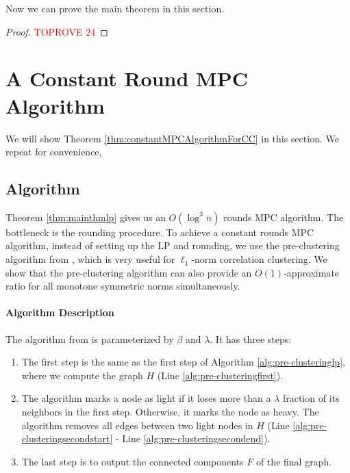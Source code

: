 \documentclass[11pt]{article}
\begin{document}
\begin{CJK*}{UTF8}{gbsn}
Now we can prove the main theorem in this section.

\begin{proof}\textcolor{red}{TOPROVE 24}\end{proof}






%
 
\section{A Constant Round MPC Algorithm}
\label{sec:MPC-solve-LP}
We will show Theorem \ref{thm:constantMPCAlgorithmForCC} in this section. We repeat for convenience, 
\thmconstantMPCAlgorithmForCC*



\subsection{Algorithm}
Theorem \ref{thm:mainthmlp} gives us an $O(\log^3 n)$ rounds MPC algorithm. The bottleneck is the rounding procedure. To achieve a constant rounds MPC algorithm, instead of setting up the LP and rounding, we use the pre-clustering algorithm from \cite{cohen2021correlation}, which is very useful for $\ell_1$-norm correlation clustering. We show that the pre-clustering algorithm can also provide an $O(1)$-approximate ratio for all monotone symmetric
norms simultaneously.

\paragraph{Algorithm Description} The algorithm from \cite{cohen2021correlation} is parameterized by $\beta$ and $\lambda$. It has three steps: 
\begin{enumerate}
    \item The first step is the same as the first step of Algorithm \ref{alg:pre-clusteringlp}, where we compute the graph $H$ (Line \ref{alg:pre-clusteringfirst}).
    \item The algorithm marks a node as light if it loses more than a $\lambda$ fraction of its neighbors in the first step. Otherwise, it marks the node as heavy. The algorithm removes all edges between two light nodes in $H$ (Line \ref{alg:pre-clusteringsecondstart} - Line \ref{alg:pre-clusteringsecondend}).
    \item The last step is to output the connected components $F$ of the final graph.
\end{enumerate}


\end{CJK*}
\end{document}
